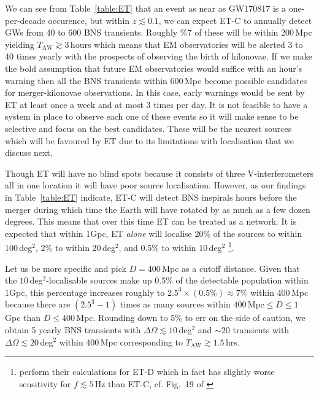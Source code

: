 \documentclass{aa}
\begin{document}
We can see from Table~\ref{table:ET} that an event as near as GW170817 is a one-per-decade occurence,
but within $z\lesssim 0.1$, we can expect ET-C to annually detect GWs from 40 to 600 BNS transients.
Roughly \%7 of these will be within 200\,Mpc yielding $T_\text{AW}\gtrsim 3\,$hours which means that EM observatories will be alerted 3 to 40 times yearly with the prospects of observing the birth of kilonovae.
If we make the bold assumption that future EM observatories would suffice with an hour's warning then
all the BNS transients within 600\,Mpc become possible candidates for merger-kilonovae observations.
In this case, early warnings would be sent by ET at least once a week and at most 3 times per day.
It is not feasible to have a system in place to observe each one of these events
so it will make sense to be selective and focus on the best candidates.
These  will be the nearest sources which will be favoured by ET due to its limitations with localisation
that we discuss next.

Though ET will have no blind spots because it consists of three V-interferometers all in one location
it will have poor source localisation. However, as our findings in Table~\ref{table:ET} indicate, ET-C will
detect BNS inspirals hours before the merger during which time the Earth will have rotated by as much as
a few dozen degrees. This means that over this time ET can be treated as a network.
It is expected that within 1Gpc, ET \emph{alone} will localise 20\% of the sources to within 100\,deg$^2$, 
2\% to within 20\,deg$^2$, and 0.5\% to within 10\,deg$^2$ \citep{Zhao:2017cbb} 
\footnote{\cite{Zhao:2017cbb} perform their calculations for ET-D which in fact has slightly worse sensitivity for $f\lesssim 5\,$Hz than ET-C, cf. Fig.~19 of \citep{GW_IFO_LRR}}.

Let us be more specific and pick $D=400\,$Mpc as a cutoff distance. Given that the $10\,$deg$^{2}$-localisable
sources make up 0.5\% of the detectable population within 1Gpc, this percentage increases roughly to $2.5^3\times (0.5\%)\approx 7\%$ within 400\,Mpc because 
there are $ (2.5^3-1)$ times as many sources within $400\,\text{Mpc}\le D\le 1\,$Gpc than $D\le 400\,$Mpc.
Rounding down to 5\% to err on the side of caution, we obtain 5 yearly BNS transients with $\Delta\Omega \lesssim 10\,$deg$^2$ and $\sim20$ transients with $\Delta\Omega \lesssim 20\,$deg$^2$ within 400\,Mpc corresponding to $T_\text{AW}\gtrsim 1.5\,$hrs.
\end{document}
